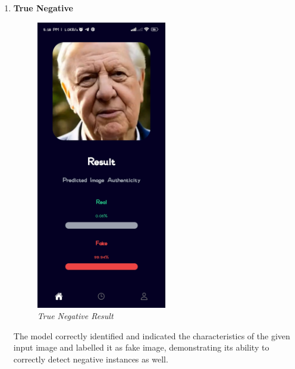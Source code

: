 \begin{enumerate}
    \item \textbf{True Negative}
          \\
          \begin{figure}[ht]
              \centering
              \includegraphics[height =5in ]{img/oldmanResult.jpg}
              \caption{\textit{True Negative Result}}
          \end{figure}

          The model correctly identified and indicated the characteristics of the given input image and labelled it as fake image, demonstrating its ability to correctly detect negative instances as well.
          \newpage



\end{enumerate}
